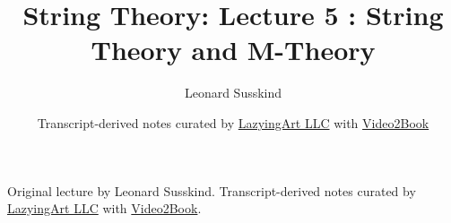 \documentclass[11pt,oneside]{book}
\begin{document}
\frontmatter
\title{String Theory: Lecture 5 : String Theory and M-Theory}
\author{Leonard Susskind}
\date{Transcript-derived notes curated by \href{https://lazying.art}{LazyingArt LLC} with \href{https://github.com/lachlanchen/Video2Book}{Video2Book}}
\maketitle
\begin{center}
\small Original lecture by Leonard Susskind. Transcript-derived notes curated by \href{https://lazying.art}{LazyingArt LLC} with \href{https://github.com/lachlanchen/Video2Book}{Video2Book}.
\end{center}
\clearpage
\mainmatter

\end{document}
